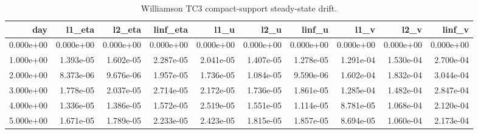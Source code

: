 \begin{table}[htbp]
\centering
{}
\begin{tabular}{rrrrrrrrrr}
\toprule
day & l1\_eta & l2\_eta & linf\_eta & l1\_u & l2\_u & linf\_u & l1\_v & l2\_v & linf\_v \\
\midrule
0.000e+00 & 0.000e+00 & 0.000e+00 & 0.000e+00 & 0.000e+00 & 0.000e+00 & 0.000e+00 & 0.000e+00 & 0.000e+00 & 0.000e+00 \\
1.000e+00 & 1.393e-05 & 1.602e-05 & 2.287e-05 & 2.041e-05 & 1.407e-05 & 1.278e-05 & 1.291e-04 & 1.530e-04 & 2.700e-04 \\
2.000e+00 & 8.373e-06 & 9.676e-06 & 1.957e-05 & 1.736e-05 & 1.084e-05 & 9.590e-06 & 1.602e-04 & 1.832e-04 & 3.044e-04 \\
3.000e+00 & 1.778e-05 & 2.037e-05 & 2.714e-05 & 2.172e-05 & 1.736e-05 & 1.861e-05 & 1.285e-04 & 1.482e-04 & 2.847e-04 \\
4.000e+00 & 1.336e-05 & 1.386e-05 & 1.572e-05 & 2.519e-05 & 1.551e-05 & 1.114e-05 & 8.781e-05 & 1.068e-04 & 2.120e-04 \\
5.000e+00 & 1.671e-05 & 1.789e-05 & 2.233e-05 & 2.423e-05 & 1.815e-05 & 1.857e-05 & 8.694e-05 & 1.060e-04 & 2.173e-04 \\
\bottomrule
\end{tabular}
\caption{Williamson TC3 compact-support steady-state drift.}
\end{table}
